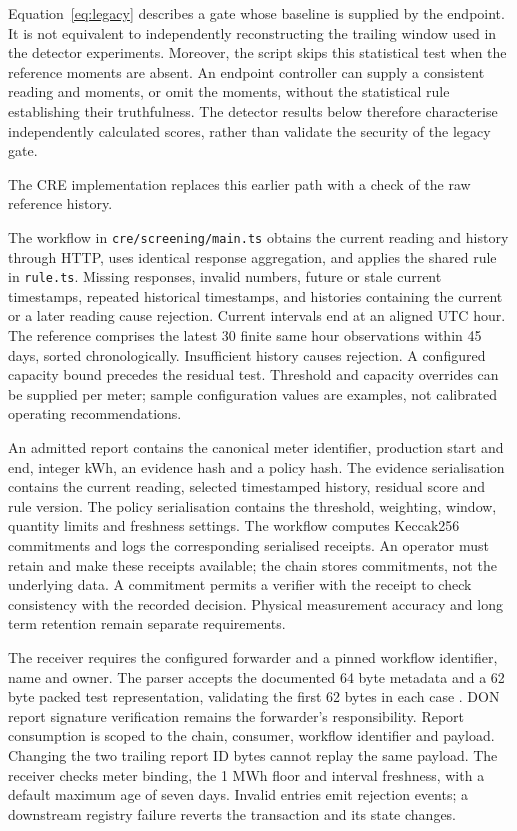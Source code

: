 \documentclass[11pt,a4paper]{article}
\newcommand{\code}[1]{\texttt{\small #1}}
\begin{document}
Equation~\eqref{eq:legacy} describes a gate whose baseline is supplied by the endpoint. It is not equivalent to independently reconstructing the trailing window used in the detector experiments. Moreover, the script skips this statistical test when the reference moments are absent. An endpoint controller can supply a consistent reading and moments, or omit the moments, without the statistical rule establishing their truthfulness. The detector results below therefore characterise independently calculated scores, rather than validate the security of the legacy gate.


The CRE implementation replaces this earlier path with a check of the raw reference history.


The workflow in \code{cre/screening/main.ts} obtains the current reading and history through HTTP, uses identical response aggregation, and applies the shared rule in \code{rule.ts}. Missing responses, invalid numbers, future or stale current timestamps, repeated historical timestamps, and histories containing the current or a later reading cause rejection. Current intervals end at an aligned UTC hour. The reference comprises the latest 30 finite same hour observations within 45 days, sorted chronologically. Insufficient history causes rejection. A configured capacity bound precedes the residual test. Threshold and capacity overrides can be supplied per meter; sample configuration values are examples, not calibrated operating recommendations.

An admitted report contains the canonical meter identifier, production start and end, integer kWh, an evidence hash and a policy hash. The evidence serialisation contains the current reading, selected timestamped history, residual score and rule version. The policy serialisation contains the threshold, weighting, window, quantity limits and freshness settings. The workflow computes Keccak256 commitments and logs the corresponding serialised receipts. An operator must retain and make these receipts available; the chain stores commitments, not the underlying data. A commitment permits a verifier with the receipt to check consistency with the recorded decision. Physical measurement accuracy and long term retention remain separate requirements.

The receiver requires the configured forwarder and a pinned workflow identifier, name and owner. The parser accepts the documented 64 byte metadata and a 62 byte packed test representation, validating the first 62 bytes in each case \cite{creconsumer}. DON report signature verification remains the forwarder's responsibility. Report consumption is scoped to the chain, consumer, workflow identifier and payload. Changing the two trailing report ID bytes cannot replay the same payload. The receiver checks meter binding, the 1 MWh floor and interval freshness, with a default maximum age of seven days. Invalid entries emit rejection events; a downstream registry failure reverts the transaction and its state changes.
\end{document}
